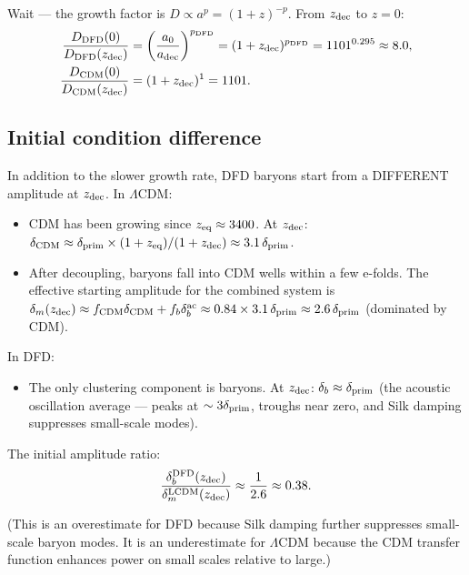 \documentclass[aps,prd,twocolumn,nofootinbib]{revtex4-2}
\newcommand{\LCDM}{$\Lambda$CDM}
\begin{document}
Wait --- the growth factor is $D \propto a^p = (1+z)^{-p}$. From
$z_{\rm dec}$ to $z = 0$:
\begin{align}
\frac{D_{\rm DFD}(0)}{D_{\rm DFD}(z_{\rm dec})}
&= \left(\frac{a_0}{a_{\rm dec}}\right)^{p_{\rm DFD}}
= (1+z_{\rm dec})^{p_{\rm DFD}}
= 1101^{0.295} \approx 8.0, \label{eq:D-DFD}\\
\frac{D_{\rm CDM}(0)}{D_{\rm CDM}(z_{\rm dec})}
&= (1+z_{\rm dec})^{1} = 1101.
\label{eq:D-CDM}
\end{align}

\subsection{Initial condition difference}

In addition to the slower growth rate, DFD baryons start from a
DIFFERENT amplitude at $z_{\rm dec}$. In \LCDM:
\begin{itemize}
\item CDM has been growing since $z_{\rm eq} \approx 3400$.
  At $z_{\rm dec}$: $\delta_{\rm CDM} \approx
  \delta_{\rm prim}\times(1+z_{\rm eq})/(1+z_{\rm dec})
  \approx 3.1\,\delta_{\rm prim}$.
\item After decoupling, baryons fall into CDM wells within a few
  e-folds. The effective starting amplitude for the combined system
  is $\delta_m(z_{\rm dec}) \approx f_{\rm CDM}\delta_{\rm CDM}
  + f_b\delta_b^{\rm ac} \approx 0.84 \times 3.1\,\delta_{\rm prim}
  \approx 2.6\,\delta_{\rm prim}$ (dominated by CDM).
\end{itemize}

In DFD:
\begin{itemize}
\item The only clustering component is baryons.
  At $z_{\rm dec}$: $\delta_b \approx \delta_{\rm prim}$
  (the acoustic oscillation average --- peaks at
  $\sim 3\delta_{\rm prim}$, troughs near zero, and Silk damping
  suppresses small-scale modes).
\end{itemize}

The initial amplitude ratio:
\begin{equation}
\frac{\delta_b^{\rm DFD}(z_{\rm dec})}{\delta_m^{\rm LCDM}(z_{\rm dec})}
\approx \frac{1}{2.6} \approx 0.38.
\label{eq:IC-ratio}
\end{equation}

(This is an overestimate for DFD because Silk damping further
suppresses small-scale baryon modes. It is an underestimate for
\LCDM{} because the CDM transfer function enhances power on small
scales relative to large.)
\end{document}
